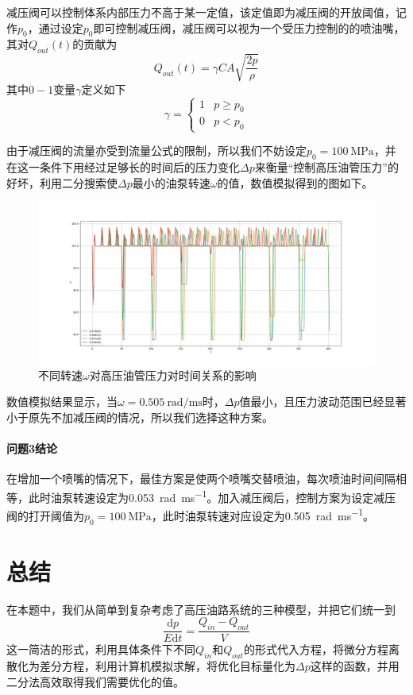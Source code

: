 \documentclass[12pt,AutoFakeBold]{article}%
\newcommand{\dif}{\mathrm{d}}
\begin{document}
    减压阀可以控制体系内部压力不高于某一定值，该定值即为减压阀的开放阈值，记作$p_0$，通过设定$p_0$即可控制减压阀，减压阀可以视为一个受压力控制的的喷油嘴，其对$Q_{out}(t)$的贡献为
    \begin{equation}
        Q_{out}(t)=\gamma CA\sqrt{\frac{2p}{\rho}}
    \end{equation}
    其中$0-1$变量$\gamma$定义如下
    \begin{equation}
        \gamma=
        \begin{cases}
            1&p\geq p_0\\
            0&p<p_0
        \end{cases}
    \end{equation}\par
    由于减压阀的流量亦受到流量公式的限制，所以我们不妨设定$p_0=\SI{100}{\MPa}$，并在这一条件下用经过足够长的时间后的压力变化$\Delta p$来衡量“控制高压油管压力”的好坏，利用二分搜索使$\Delta p$最小的油泵转速$\omega$的值，数值模拟得到的图如下。
    \begin{figure}[H]
        \centering
        \includegraphics[scale=0.32]{figure/3-5.png}
        \caption{不同转速$\omega$对高压油管压力对时间关系的影响}
    \end{figure}\par
    数值模拟结果显示，当$\omega=\SI{0.505}{\radian\per\ms}$时，$\Delta p$值最小，且压力波动范围已经显著小于原先不加减压阀的情况，所以我们选择这种方案。
    \paragraph{问题3结论}
    在增加一个喷嘴的情况下，最佳方案是使两个喷嘴交替喷油，每次喷油时间间隔相等，此时油泵转速设定为\SI{0.053}{\radian\per\ms}。加入减压阀后，控制方案为设定减压阀的打开阈值为$p_0=\SI{100}{\MPa}$，此时油泵转速对应设定为\SI{0.505}{\radian\per\ms}。

    
    \section{总结}
    在本题中，我们从简单到复杂考虑了高压油路系统的三种模型，并把它们统一到
    \[\frac{\dif p}{E\dif t}=\frac{Q_{in}-Q_{out}}{V}\]
    这一简洁的形式，利用具体条件下不同$Q_{in}$和$Q_{out}$的形式代入方程，将微分方程离散化为差分方程，利用计算机模拟求解，将优化目标量化为$\Delta p$这样的函数，并用二分法高效取得我们需要优化的值。\par
\end{document}
